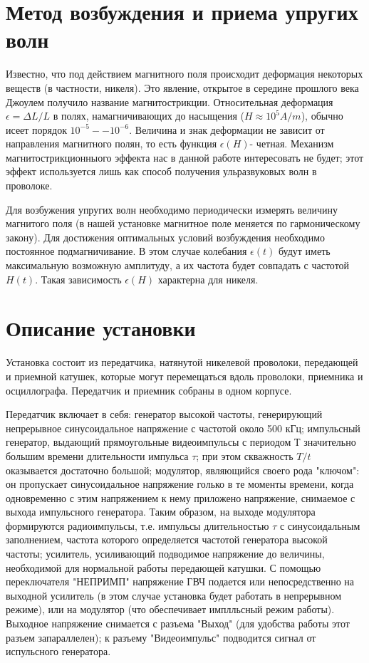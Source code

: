 \section{Метод возбуждения и приема упругих волн}

Известно, что под действием магнитного поля происходит деформация некоторых веществ (в частности, никеля). Это явление, открытое в середине прошлого века Джоулем получило название магнитострикции. Относительная деформация $\epsilon=\Delta L/L$ в полях, намагничивающих до насыщения ($H\approx10^5 A/m$), обычно исеет порядок $10^{-5}--10^{-6}$. Величина и знак деформации не зависит от направления магнитного полян, то есть функция $\epsilon(H)$- четная. Механизм магнитострикционныого эффекта нас в данной работе интересовать не будет; этот эффект используется лишь как способ получения ульразвуковых волн в проволоке.

Для возбужения упругих волн необходимо периодически измерять величину магнитого поля (в нашей установке магнитное поле меняется по гармоническому закону). Для достижения оптимальных условий возбуждения необходимо постоянное подмагничивание. В этом случае колебания $\epsilon(t)$ будут иметь максимальную возможную амплитуду, а их частота будет совпадать с частотой $H(t)$. Такая зависимость $\epsilon(H)$ характерна для никеля.

\section{Описание установки}

Установка состоит из передатчика, натянутой никелевой проволоки, передающей и приемной катушек, которые могут перемещаться вдоль проволоки, приемника и осциллографа. Передатчик и приемник собраны в одном корпусе.

Передатчик включает в себя: генератор высокой частоты, генерирующий непрерывное синусоидальное напряжение с частотой около 500 кГц; импульсный генератор, выдающий прямоугольные видеоимпульсы с периодом Т значительно большим времени длительности импульса $\tau$; при этом скважность $T/t$ оказывается достаточно большой; модулятор, являющийся своего рода "ключом": он пропускает синусоидальное напряжение голько в те моменты времени, когда одновременно с этим напряжением к нему приложено напряжение, снимаемое с выхода импульсного генератора. Таким образом, на выходе модулятора формируются радиоимпульсы, т.е. импульсы длительностью $\tau$ с синусоидальным заполнением, частота которого определяется частотой генератора высокой частоты; усилитель, усиливающий подводимое напряжение до величины, необходимой для нормальной работы передающей катушки.
С помощью переключателя "НЕПРИМП" напряжение ГВЧ подается или непосредственно на выходной усилитель (в этом случае установка будет работать в непрерывном режиме), или на модулятор (что обеспечивает имплльсный режим работы). Выходное напряжение снимается с разъема "Выход" (для удобства работы этот разъем запараллелен); к разъему "Видеоимпульс" подводится сигнал от испульсного генератора.

